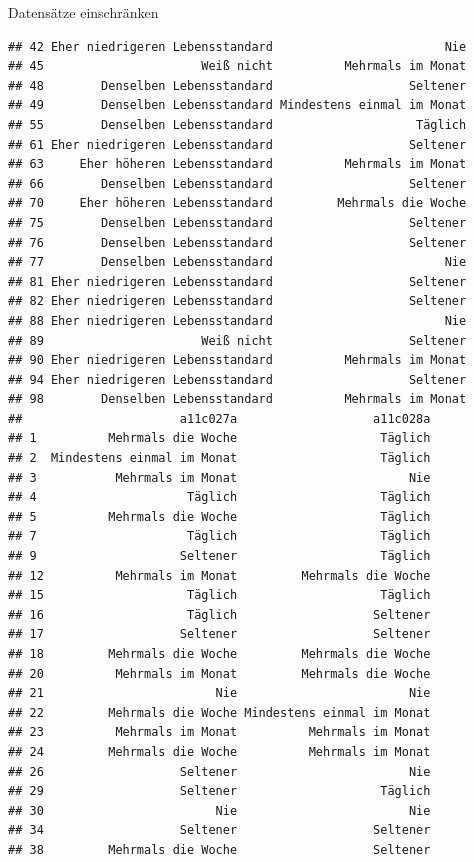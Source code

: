 \documentclass[ignorenonframetext,]{beamer}
\begin{document}
\begin{frame}[fragile]{Datensätze einschränken}
\begin{verbatim}
## 42 Eher niedrigeren Lebensstandard                        Nie
## 45                      Weiß nicht          Mehrmals im Monat
## 48        Denselben Lebensstandard                   Seltener
## 49        Denselben Lebensstandard Mindestens einmal im Monat
## 55        Denselben Lebensstandard                    Täglich
## 61 Eher niedrigeren Lebensstandard                   Seltener
## 63     Eher höheren Lebensstandard          Mehrmals im Monat
## 66        Denselben Lebensstandard                   Seltener
## 70     Eher höheren Lebensstandard         Mehrmals die Woche
## 75        Denselben Lebensstandard                   Seltener
## 76        Denselben Lebensstandard                   Seltener
## 77        Denselben Lebensstandard                        Nie
## 81 Eher niedrigeren Lebensstandard                   Seltener
## 82 Eher niedrigeren Lebensstandard                   Seltener
## 88 Eher niedrigeren Lebensstandard                        Nie
## 89                      Weiß nicht                   Seltener
## 90 Eher niedrigeren Lebensstandard          Mehrmals im Monat
## 94 Eher niedrigeren Lebensstandard                   Seltener
## 98        Denselben Lebensstandard          Mehrmals im Monat
##                      a11c027a                   a11c028a
## 1          Mehrmals die Woche                    Täglich
## 2  Mindestens einmal im Monat                    Täglich
## 3           Mehrmals im Monat                        Nie
## 4                     Täglich                    Täglich
## 5          Mehrmals die Woche                    Täglich
## 7                     Täglich                    Täglich
## 9                    Seltener                    Täglich
## 12          Mehrmals im Monat         Mehrmals die Woche
## 15                    Täglich                    Täglich
## 16                    Täglich                   Seltener
## 17                   Seltener                   Seltener
## 18         Mehrmals die Woche         Mehrmals die Woche
## 20          Mehrmals im Monat         Mehrmals die Woche
## 21                        Nie                        Nie
## 22         Mehrmals die Woche Mindestens einmal im Monat
## 23          Mehrmals im Monat          Mehrmals im Monat
## 24         Mehrmals die Woche          Mehrmals im Monat
## 26                   Seltener                        Nie
## 29                   Seltener                    Täglich
## 30                        Nie                        Nie
## 34                   Seltener                   Seltener
## 38         Mehrmals die Woche                   Seltener

\end{verbatim}
\end{frame}
\end{document}
